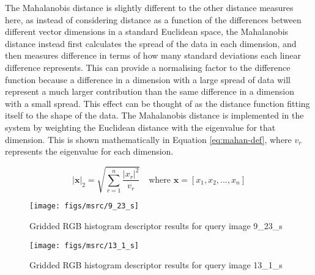 \begin{appendices}
The Mahalanobis distance is slightly different to the other distance measures here, as instead of considering distance as a function of the differences between different vector dimensions in a standard Euclidean space, the Mahalanobis distance instead first calculates the spread of the data in each dimension, and then measures difference in terms of how many standard deviations each linear difference represents. This can provide a normalising factor to the difference function because a difference in a dimension with a large spread of data will represent a much larger contribution than the same difference in a dimension with a small spread. This effect can be thought of as the distance function fitting itself to the shape of the data. The Mahalanobis distance is implemented in the system by weighting the Euclidean distance with the eigenvalue for that dimension. This is shown mathematically in Equation \ref{eq:mahan-def}, where $v_r$ represents the eigenvalue for each dimension.

\begin{equation}
|\mathbf{x}|_2 = \sqrt{\sum_{r=1}^{n} \frac{|x_r|^2}{v_r} } \quad \text{where } \mathbf{x} = [ x_1 , x_2, ... , x_n] \label{eq:mahan-def}
\end{equation}

\begin{figure}[ht]
	\begin{minipage}[]{0.3\linewidth}
		\centering
		\texttt{[image: figs/msrc/9\_23\_s]}
	\end{minipage}
	\begin{minipage}[]{0.7\linewidth}
		\centering
		\prplotclose
	\end{minipage}
	\caption{Gridded RGB histogram descriptor results for query image 9\_23\_s}
	\label{fig:dist-meas-sheep}
\end{figure}

\begin{figure}[ht]
	\begin{minipage}[]{0.3\linewidth}
		\centering
		\texttt{[image: figs/msrc/13\_1\_s]}
	\end{minipage}
	\begin{minipage}[]{0.7\linewidth}
		\centering
		\prplotclose
	\end{minipage}
	\caption{Gridded RGB histogram descriptor results for query image 13\_1\_s}
	\label{fig:dist-meas-books}
\end{figure}


\end{appendices}
